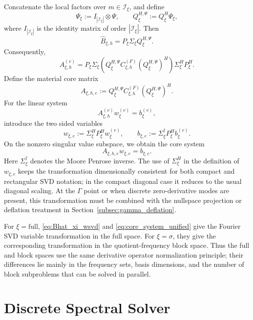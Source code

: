 \documentclass[11pt,oneside]{article}
\numberwithin{equation}{section}
\theoremstyle{plain}
\theoremstyle{remark}
\begin{document}
Concatenate the local factors over \(m\in\mathcal I_\xi\), and define
\[
\Psi_\xi:=I_{|\mathcal I_\xi|}\otimes\Psi,
\qquad
Q_\xi^{H,\Psi}:=Q_\xi^H\Psi_\xi,
\]
where \(I_{|\mathcal I_\xi|}\) is the identity matrix of order \(|\mathcal I_\xi|\). Then
\begin{equation}\label{eq:Bhat_xi_wsvd}
\widehat B_{\xi,h}=P_\xi\Sigma_\xi Q_\xi^{H,\Psi}.
\end{equation}
Consequently,
\begin{equation}\label{eq:Av_xi_factor}
A_{\xi,h}^{(v)}
=P_\xi\Sigma_\xi
\left(Q_\xi^{H,\Psi}C_{\xi,h}^{(F)}(Q_\xi^{H,\Psi})^H\right)
\Sigma_\xi^H P_\xi^H.
\end{equation}
Define the material core matrix
\begin{equation}\label{eq:A_xi_core_def}
A_{\xi,h,e}:=Q_\xi^{H,\Psi}C_{\xi,h}^{(F)}(Q_\xi^{H,\Psi})^H.
\end{equation}
For the linear system
\[
A_{\xi,h}^{(v)}w_\xi^{(v)}=b_\xi^{(v)},
\]
introduce the two sided variables
\begin{equation}\label{eq:two_sided_variables_unified}
w_{\xi,e}:=\Sigma_\xi^H P_\xi^H w_\xi^{(v)},
\qquad
b_{\xi,e}:=\Sigma_\xi^\dagger P_\xi^H b_\xi^{(v)}.
\end{equation}
On the nonzero singular value subspace, we obtain the core system
\begin{equation}\label{eq:core_system_unified}
A_{\xi,h,e}w_{\xi,e}=b_{\xi,e}.
\end{equation}
Here \(\Sigma_\xi^\dagger\) denotes the Moore Penrose inverse. The use of \(\Sigma_\xi^H\) in the definition of \(w_{\xi,e}\) keeps the transformation dimensionally consistent for both compact and rectangular SVD notation; in the compact diagonal case it reduces to the usual diagonal scaling. At the \(\Gamma\) point or when discrete zero-derivative modes are present, this transformation must be combined with the nullspace projection or deflation treatment in Section~\ref{subsec:gamma_deflation}.

For \(\xi=\mathrm{full}\), \eqref{eq:Bhat_xi_wsvd} and \eqref{eq:core_system_unified} give the Fourier SVD variable transformation in the full space. For \(\xi=\sigma\), they give the corresponding transformation in the quotient-frequency block space. Thus the full and block spaces use the same derivative operator normalization principle; their differences lie mainly in the frequency sets, basis dimensions, and the number of block subproblems that can be solved in parallel.

\section{Discrete Spectral Solver}
\label{sec:impl}
\end{document}
